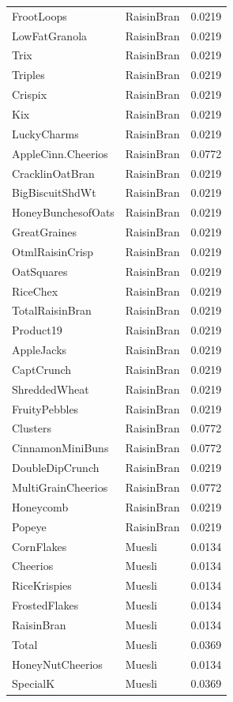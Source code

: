 \begin{longtable}{llr}
FrootLoops & RaisinBran & 0.0219 \\
LowFatGranola & RaisinBran & 0.0219 \\
Trix & RaisinBran & 0.0219 \\
Triples & RaisinBran & 0.0219 \\
Crispix & RaisinBran & 0.0219 \\
Kix & RaisinBran & 0.0219 \\
LuckyCharms & RaisinBran & 0.0219 \\
AppleCinn.Cheerios & RaisinBran & 0.0772 \\
CracklinOatBran & RaisinBran & 0.0219 \\
BigBiscuitShdWt & RaisinBran & 0.0219 \\
HoneyBunchesofOats & RaisinBran & 0.0219 \\
GreatGraines & RaisinBran & 0.0219 \\
OtmlRaisinCrisp & RaisinBran & 0.0219 \\
OatSquares & RaisinBran & 0.0219 \\
RiceChex & RaisinBran & 0.0219 \\
TotalRaisinBran & RaisinBran & 0.0219 \\
Product19 & RaisinBran & 0.0219 \\
AppleJacks & RaisinBran & 0.0219 \\
CaptCrunch & RaisinBran & 0.0219 \\
ShreddedWheat & RaisinBran & 0.0219 \\
FruityPebbles & RaisinBran & 0.0219 \\
Clusters & RaisinBran & 0.0772 \\
CinnamonMiniBuns & RaisinBran & 0.0772 \\
DoubleDipCrunch & RaisinBran & 0.0219 \\
MultiGrainCheerios & RaisinBran & 0.0772 \\
Honeycomb & RaisinBran & 0.0219 \\
Popeye & RaisinBran & 0.0219 \\
CornFlakes & Muesli & 0.0134 \\
Cheerios & Muesli & 0.0134 \\
RiceKrispies & Muesli & 0.0134 \\
FrostedFlakes & Muesli & 0.0134 \\
RaisinBran & Muesli & 0.0134 \\
Total & Muesli & 0.0369 \\
HoneyNutCheerios & Muesli & 0.0134 \\
SpecialK & Muesli & 0.0369 \\

\end{longtable}
